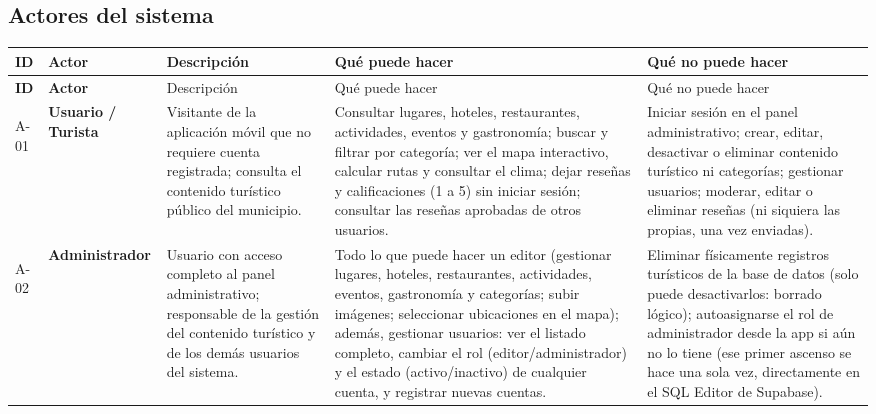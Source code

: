 
\subsection*{Actores del sistema}

{\footnotesize
\begin{longtable}{|>{\bfseries}p{1.0cm}|>{\bfseries}p{2.1cm}|p{3.2cm}|p{4.3cm}|p{4.1cm}|}
\hline
ID & Actor & Descripción & Qué puede hacer & Qué no puede hacer \\ \hline
\endfirsthead
\hline
ID & Actor & Descripción & Qué puede hacer & Qué no puede hacer \\ \hline
\endhead
\hline
\endfoot
\hline
\endlastfoot

A-01 & Usuario / Turista &
Visitante de la aplicación móvil que no requiere cuenta registrada; consulta el contenido turístico público del municipio. &
Consultar lugares, hoteles, restaurantes, actividades, eventos y gastronomía; buscar y filtrar por categoría; ver el mapa interactivo, calcular rutas y consultar el clima; dejar reseñas y calificaciones (1 a 5) sin iniciar sesión; consultar las reseñas aprobadas de otros usuarios. &
Iniciar sesión en el panel administrativo; crear, editar, desactivar o eliminar contenido turístico ni categorías; gestionar usuarios; moderar, editar o eliminar reseñas (ni siquiera las propias, una vez enviadas). \\ \hline

A-02 & Administrador &
Usuario con acceso completo al panel administrativo; responsable de la gestión del contenido turístico y de los demás usuarios del sistema. &
Todo lo que puede hacer un editor (gestionar lugares, hoteles, restaurantes, actividades, eventos, gastronomía y categorías; subir imágenes; seleccionar ubicaciones en el mapa); además, gestionar usuarios: ver el listado completo, cambiar el rol (editor/administrador) y el estado (activo/inactivo) de cualquier cuenta, y registrar nuevas cuentas. &
Eliminar físicamente registros turísticos de la base de datos (solo puede desactivarlos: borrado lógico); autoasignarse el rol de administrador desde la app si aún no lo tiene (ese primer ascenso se hace una sola vez, directamente en el SQL Editor de Supabase). \\ \hline


\end{longtable}}

